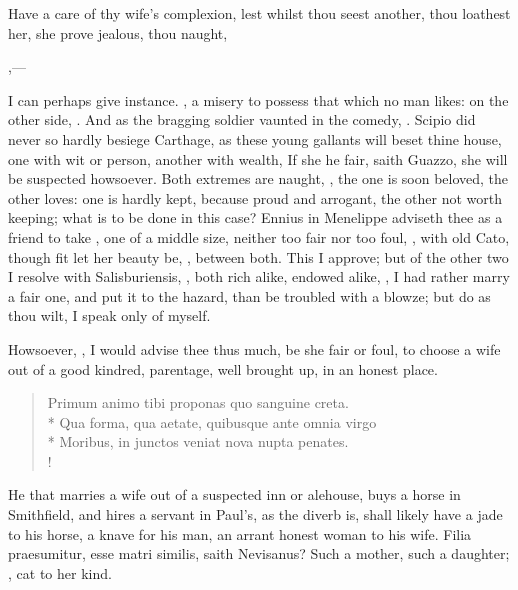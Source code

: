 Have a care of thy wife's complexion, lest whilst thou seest another,
thou loathest her, she prove jealous, thou naught,

,---

I can perhaps give instance. , a misery to possess that which no man likes: on the other
side, . And as the bragging
soldier vaunted in the comedy, . Scipio did never so hardly besiege Carthage, as these young
gallants will beset thine house, one with wit or person, another with
wealth, \etc{} If she he fair, saith Guazzo, she will be suspected
howsoever. Both extremes are naught, , the one is soon beloved, the other loves: one is
hardly kept, because proud and arrogant, the other not worth keeping;
what is to be done in this case? Ennius in Menelippe adviseth thee as a
friend to take , one
of a middle size, neither too fair nor too foul, , with old Cato, though fit let her beauty
be, , between both. This I approve;
but of the other two I resolve with Salisburiensis, ,
both rich alike, endowed alike, , I had rather marry a fair one, and put it to the
hazard, than be troubled with a blowze; but do as thou wilt, I speak
only of myself.

Howsoever, , I would advise thee thus much, be she
fair or foul, to choose a wife out of a good kindred, parentage, well
brought up, in an honest place.
%
\begin{latin}
\begin{verse}%
Primum animo tibi proponas quo sanguine creta.\\*
Qua forma, qua aetate, quibusque ante omnia virgo\\*
Moribus, in junctos veniat nova nupta penates.\\!
\end{verse}%
\end{latin}
%

He that marries a wife out of a suspected inn or alehouse, buys a horse
in Smithfield, and hires a servant in Paul's, as the diverb is, shall
likely have a jade to his horse, a knave for his man, an arrant honest
woman to his wife. Filia praesumitur, esse matri similis, saith
Nevisanus? Such a mother, such a daughter; , cat to her kind.

